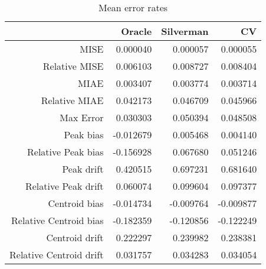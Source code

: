 \begin{table}[ht]
\centering
\begin{tabular}{rrrr}
  \hline
 & Oracle & Silverman & CV \\ 
  \hline
MISE & 0.000040 & 0.000057 & 0.000055 \\ 
  Relative MISE & 0.006103 & 0.008727 & 0.008404 \\ 
  MIAE & 0.003407 & 0.003774 & 0.003714 \\ 
  Relative MIAE & 0.042173 & 0.046709 & 0.045966 \\ 
  Max Error & 0.030303 & 0.050394 & 0.048508 \\ 
  Peak bias & -0.012679 & 0.005468 & 0.004140 \\ 
  Relative Peak bias & -0.156928 & 0.067680 & 0.051246 \\ 
  Peak drift & 0.420515 & 0.697231 & 0.681640 \\ 
  Relative Peak drift & 0.060074 & 0.099604 & 0.097377 \\ 
  Centroid bias & -0.014734 & -0.009764 & -0.009877 \\ 
  Relative Centroid bias & -0.182359 & -0.120856 & -0.122249 \\ 
  Centroid drift & 0.222297 & 0.239982 & 0.238381 \\ 
  Relative Centroid drift & 0.031757 & 0.034283 & 0.034054 \\ 
   \hline
\end{tabular}
\caption{Mean error rates} 
\label{tbl:mean_error_rates}
\end{table}
